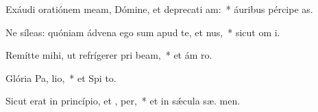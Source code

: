 \item Exáudi oratiónem meam, Dómine, et deprecati am:~* áuribus pércipe  as.
\item Ne síleas: quóniam ádvena ego sum apud te, et nus,~* sicut om  i.
\item Remítte mihi, ut refrígerer pri beam,~* et ám  ro.
\item Glória Pa,  lio,~* et Spi to.
\item Sicut erat in princípio, et ,  per,~* et in sǽcula sæ. men.

